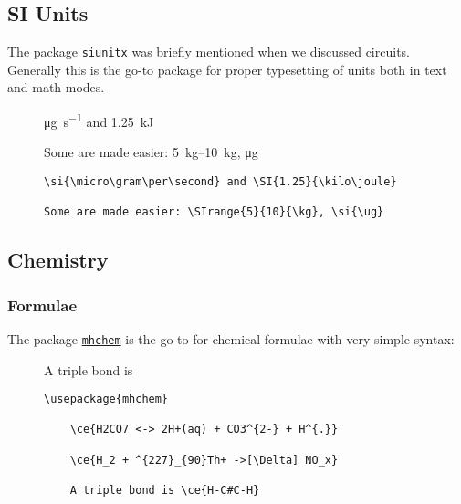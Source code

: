 \subsection{SI Units}
The package \href{https://mirror.ox.ac.uk/sites/ctan.org/macros/latex/contrib/siunitx/siunitx.pdf}{\texttt{siunitx}} was briefly mentioned when we discussed circuits.
Generally this is the go-to package for proper typesetting of units both in text and math modes.

\begin{figure}[h]
\centering
\begin{minipage}{0.45\textwidth}
    \si{\micro\gram\per\second} and \SI{1.25}{\kilo\joule}

    Some are made easier: \SIrange{5}{10}{\kg}, \si{\ug}
\end{minipage}
\hfill
\begin{minipage}{0.45\textwidth}
\begin{lstlisting}
\si{\micro\gram\per\second} and \SI{1.25}{\kilo\joule}

Some are made easier: \SIrange{5}{10}{\kg}, \si{\ug}
\end{lstlisting}
\end{minipage}

\end{figure}
\subsection{Chemistry}
\subsubsection{Formulae}
The package \href{https://texdoc.org/serve/mhchem/0}{\texttt{mhchem}} is the go-to for chemical formulae with very simple syntax:
\begin{figure}[h]
\centering
\begin{minipage}{0.49\textwidth}\centering


    A triple bond is 
\end{minipage}
\hfill
\begin{minipage}{0.49\textwidth}
    \begin{lstlisting}
\usepackage{mhchem}

    \ce{H2CO7 <-> 2H+(aq) + CO3^{2-} + H^{.}}

    \ce{H_2 + ^{227}_{90}Th+ ->[\Delta] NO_x}

    A triple bond is \ce{H-C#C-H}

\end{lstlisting}
\end{minipage}
\end{figure}


